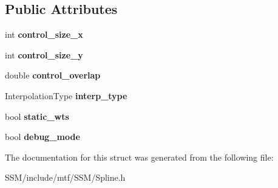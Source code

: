 \subsection*{Public Attributes}
\begin{DoxyCompactItemize}
\item 
\hypertarget{structSplineParams_ac2a46c24ec1e3e6b1688ca28ce7fa026}{int {\bfseries control\-\_\-size\-\_\-x}}\label{structSplineParams_ac2a46c24ec1e3e6b1688ca28ce7fa026}

\item 
\hypertarget{structSplineParams_a40490af32283f261c9ccd0a9f38b9a47}{int {\bfseries control\-\_\-size\-\_\-y}}\label{structSplineParams_a40490af32283f261c9ccd0a9f38b9a47}

\item 
\hypertarget{structSplineParams_ae030d33518a37a9393a3c7bd59eecda3}{double {\bfseries control\-\_\-overlap}}\label{structSplineParams_ae030d33518a37a9393a3c7bd59eecda3}

\item 
\hypertarget{structSplineParams_a46eb7af1f8b8992d18fd403721ee3873}{Interpolation\-Type {\bfseries interp\-\_\-type}}\label{structSplineParams_a46eb7af1f8b8992d18fd403721ee3873}

\item 
\hypertarget{structSplineParams_a0a2af577aaa0ab5ecc65d785c0172b21}{bool {\bfseries static\-\_\-wts}}\label{structSplineParams_a0a2af577aaa0ab5ecc65d785c0172b21}

\item 
\hypertarget{structSplineParams_aeb3a23609dcd31caca275d6ed97fa261}{bool {\bfseries debug\-\_\-mode}}\label{structSplineParams_aeb3a23609dcd31caca275d6ed97fa261}

\end{DoxyCompactItemize}


The documentation for this struct was generated from the following file\-:\begin{DoxyCompactItemize}
\item 
S\-S\-M/include/mtf/\-S\-S\-M/Spline.\-h\end{DoxyCompactItemize}
